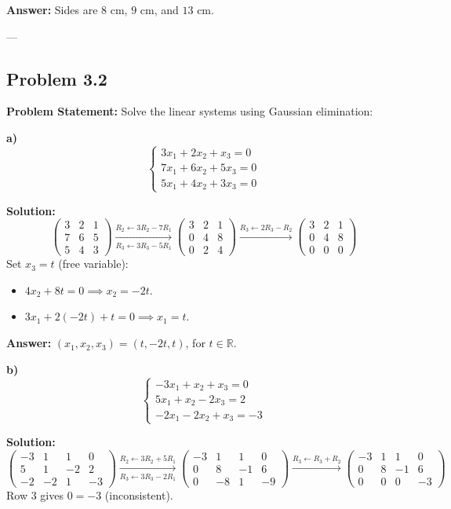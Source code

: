 \documentclass[11pt, a4paper]{article}
\begin{document}
\textbf{Answer:} Sides are $8\text{ cm}$, $9\text{ cm}$, and $13\text{ cm}$.

---

\subsection*{Problem 3.2}
\textbf{Problem Statement:} Solve the linear systems using Gaussian elimination:

\medskip
\textbf{a)}
$$ \begin{cases} 3x_1 + 2x_2 + x_3 = 0 \\ 7x_1 + 6x_2 + 5x_3 = 0 \\ 5x_1 + 4x_2 + 3x_3 = 0 \end{cases} $$

\textbf{Solution:}
$$ \begin{pmatrix} 3 & 2 & 1 \\ 7 & 6 & 5 \\ 5 & 4 & 3 \end{pmatrix} \xrightarrow[R_3 \leftarrow 3R_3 - 5R_1]{R_2 \leftarrow 3R_2 - 7R_1} \begin{pmatrix} 3 & 2 & 1 \\ 0 & 4 & 8 \\ 0 & 2 & 4 \end{pmatrix} \xrightarrow{R_3 \leftarrow 2R_3 - R_2} \begin{pmatrix} 3 & 2 & 1 \\ 0 & 4 & 8 \\ 0 & 0 & 0 \end{pmatrix} $$
Set $x_3 = t$ (free variable):
\begin{itemize}
\item $4x_2 + 8t = 0 \implies x_2 = -2t$.
\item $3x_1 + 2(-2t) + t = 0 \implies x_1 = t$.
\end{itemize}

\textbf{Answer:} $(x_1, x_2, x_3) = (t, -2t, t)$, for $t \in \mathbb{R}$.

\medskip
\textbf{b)}
$$ \begin{cases} -3x_1 + x_2 + x_3 = 0 \\ 5x_1 + x_2 - 2x_3 = 2 \\ -2x_1 - 2x_2 + x_3 = -3 \end{cases} $$

\textbf{Solution:}
$$ \left(\begin{array}{ccc|c} -3 & 1 & 1 & 0 \\ 5 & 1 & -2 & 2 \\ -2 & -2 & 1 & -3 \end{array}\right) \xrightarrow[R_3 \leftarrow 3R_3 - 2R_1]{R_2 \leftarrow 3R_2 + 5R_1} \left(\begin{array}{ccc|c} -3 & 1 & 1 & 0 \\ 0 & 8 & -1 & 6 \\ 0 & -8 & 1 & -9 \end{array}\right) \xrightarrow{R_3 \leftarrow R_3 + R_2} \left(\begin{array}{ccc|c} -3 & 1 & 1 & 0 \\ 0 & 8 & -1 & 6 \\ 0 & 0 & 0 & -3 \end{array}\right) $$
Row 3 gives $0 = -3$ (inconsistent).
\end{document}
